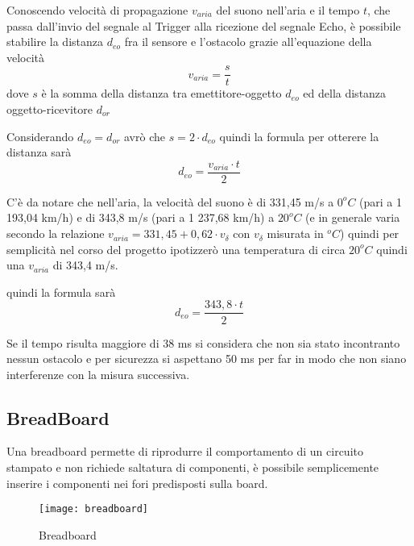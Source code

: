 Conoscendo velocità di propagazione $ v_{aria} $ del suono nell’aria e  il tempo $t$, che passa dall'invio del segnale al Trigger alla ricezione del segnale Echo, è possibile stabilire la distanza $d_{eo}$ fra il sensore e l’ostacolo  grazie all'equazione della velocità  \[v_{aria} = \dfrac{s}{t} \] dove $s$ è la somma della distanza tra emettitore-oggetto $d_{eo}$ ed della distanza oggetto-ricevitore $d_{or}$ 

Considerando $d_{eo} = d_{or}$ avrò che $s=2 \cdot d_{eo}$ quindi la formula per otterere la distanza sarà 
\[d_{eo} = \dfrac{v_{aria} \cdot t}{2} \]
 

C'è da notare che nell’aria, la velocità del suono è di 331,45 m/s a $0 ^oC$ (pari a 1 193,04 km/h) e di 343,8 m/s (pari a 1 237,68 km/h) a  $20 ^oC$ (e in generale varia secondo la relazione $v_{aria} = 331,45 + 0,62 \cdot v_\delta$ con $v_\delta$ misurata in $^oC$) quindi per semplicità nel corso del progetto ipotizzerò una temperatura di circa $20 ^oC$ quindi una $v_{aria}$ di 343,4 m/s.

quindi la formula sarà
\[d_{eo} = \dfrac{343,8 \cdot t}{2}  \]
 
Se il tempo risulta maggiore di 38 ms si considera che non sia stato incontranto nessun ostacolo e per sicurezza si aspettano 50 ms per far in modo che non siano interferenze con la misura successiva.





\subsection{BreadBoard}
Una breadboard permette di riprodurre il comportamento di un circuito stampato e non richiede saltatura di componenti, è possibile semplicemente inserire i componenti nei fori predisposti sulla board.

\begin{figure}[htbp!] 
	\centering    
	\texttt{[image: breadboard]}
	\caption[Breadboard]{Breadboard}
	\label{fig:breadboard}
\end{figure}

